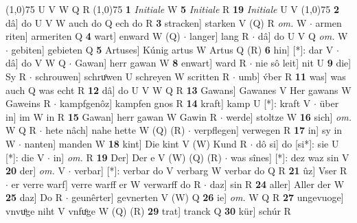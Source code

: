 \documentclass[8pt,a4paper,notitlepage]{article}
\begin{document}
\begin{table}[ht]
\begin{minipage}[t]{0.5\linewidth}
\begin{tabular}{rl}
\end{tabular}
\scriptsize
\line(1,0){75} \newline
U V W Q R \newline
\line(1,0){75} \newline
\textbf{1} \textit{Initiale} W  \textbf{5} \textit{Initiale} R  \textbf{19} \textit{Initiale} U V  \newline
\line(1,0){75} \newline
\textbf{2} dâ] do U V W auch do Q ech do R \textbf{3} stracken] starken V (Q) R \textit{om.} W  $\cdot$ armen riten] armeriten Q \textbf{4} wart] enward W (Q)  $\cdot$ langer] lang R  $\cdot$ dâ] do U V Q \textit{om.} W  $\cdot$ gebiten] gebieten Q \textbf{5} Artuses] Kúnig artus W Artus Q (R) \textbf{6} hin] [*]: dar V  $\cdot$ dâ] do V W Q  $\cdot$ Gawan] herr gawan W \textbf{8} enwart] ward R  $\cdot$ nie sô leit] nit U \textbf{9} die] Sy R  $\cdot$ schrouwen] schruͦwen U schreyen W scritten R  $\cdot$ umb] v́ber R \textbf{11} was] was auch Q was echt R \textbf{12} dâ] do U V W Q R \textbf{13} Gawans] Gawanes V Her gawans W Gaweins R  $\cdot$ kampfgenôz] kampfen gnos R \textbf{14} kraft] kamp U [*]: kraft V  $\cdot$ über in] im W in R \textbf{15} Gawan] herr gawan W Gawin R  $\cdot$ werde] stoltze W \textbf{16} sich] \textit{om.} W Q R  $\cdot$ hete nâch] nahe hette W (Q) (R)  $\cdot$ verpflegen] verwegen R \textbf{17} in] sy in W  $\cdot$ nanten] manden W \textbf{18} kint] Die kint V (W) Kund R  $\cdot$ dô si] do [si*]: sie U [*]: die V  $\cdot$ in] \textit{om.} R \textbf{19} Der] Der e V (W) (Q) (R)  $\cdot$ was sînes] [*]: dez waz sin V \textbf{20} der] \textit{om.} V  $\cdot$ verbar] [*]: verbar do V verbarg W verbar do Q R \textbf{21} ûz] Vser R  $\cdot$ er verre warf] verre warff er W verwarff do R  $\cdot$ daz] sin R \textbf{24} aller] Aller der W \textbf{25} daz] Do R  $\cdot$ geunêrter] gevnerten V (W) Q \textbf{26} ie] \textit{om.} W Q R \textbf{27} ungevuoge] vnvuͦge niht V vnfuͦge W (Q) (R) \textbf{29} trat] tranck Q \textbf{30} kür] schúr R \newline
\end{minipage}
\end{table}
\end{document}
